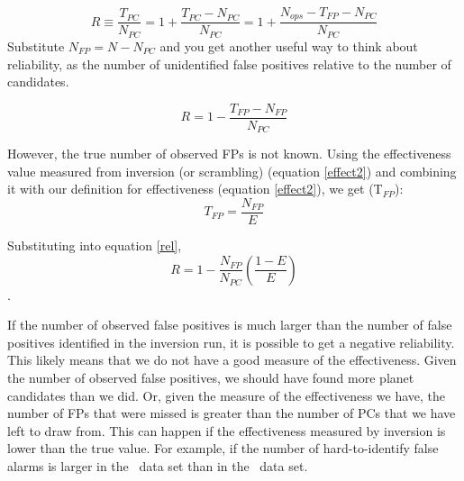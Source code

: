 \begin{equation}
R \equiv \frac{T_{PC}}{N_{PC}} =  1 + \frac{T_{PC}-N_{PC}}{N_{PC}} 
= 1 + \frac{N_{ops} - T_{FP} - N_{PC}}{N_{PC}}
\end{equation}
Substitute $N_{FP}=N-N_{PC}$ and you get another useful way to think about reliability, as the number of unidentified false positives relative to the number of candidates.

\begin{equation}
\label{rel}
R = 1 - \frac{T_{FP}-N_{FP}}{N_{PC}}
\end{equation}

However, the true number of observed FPs is not known. Using the effectiveness value measured from inversion (or scrambling) (equation \ref{effect2}) and combining it with our definition for effectiveness (equation \ref{effect2}), we get (T$_{FP}$):
\begin{equation}
T_{FP} = \frac{N_{FP}}{E} 
\end{equation}

Substituting into equation \ref{rel},
\textbf{
\begin{equation}
R= 1 - \frac{N_{FP}}{N_{PC}}(\frac{1-E}{E})
\end{equation}
}.




If the number of observed false positives is much larger than the number of false positives identified in the inversion run, it is possible to get a negative reliability. This likely means that we do not have a good measure of the effectiveness.  Given the number of observed false positives, we should have found more planet candidates than we did. Or, given the measure of the effectiveness we have, the number of FPs that were missed is greater than the number of PCs that we have left to draw from.  This can happen if the effectiveness measured by inversion is lower than the true value. For example, if the number of hard-to-identify false alarms is larger in the \invtce\ data set than in the \opstce\ data set.   